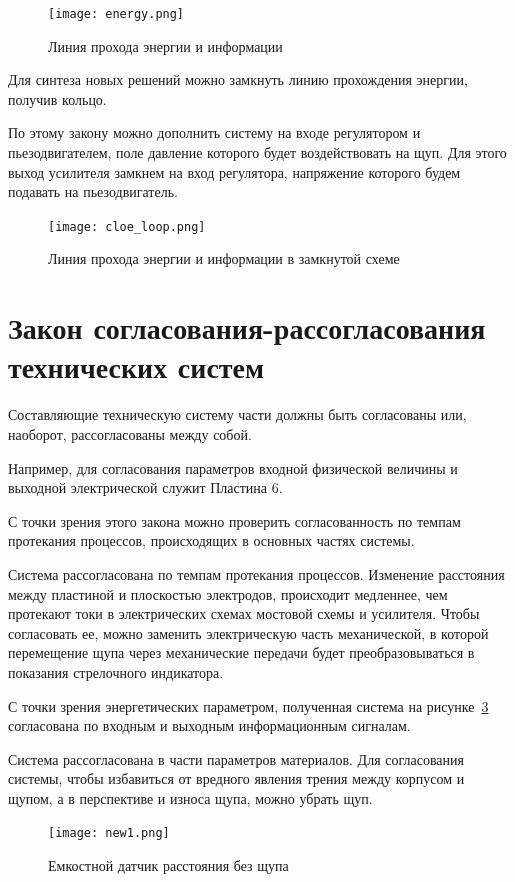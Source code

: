 \begin{figure}[h!]
	\centering
	\texttt{[image: energy.png]}
	\caption{Линия прохода энергии и информации}
	\label{}
\end{figure}

Для синтеза новых решений можно замкнуть линию прохождения энергии, получив кольцо. 

По этому закону можно дополнить систему на входе регулятором и пьезодвигателем, поле давление которого будет воздействовать на щуп. Для этого выход усилителя замкнем на вход регулятора, напряжение которого будем подавать на пьезодвигатель.

\begin{figure}[h!]
	\centering
	\texttt{[image: cloe\_loop.png]}
	\caption{Линия прохода энергии и информации в замкнутой схеме}
	\label{sogl1}
\end{figure}

\section{Закон согласования-рассогласования технических систем}

Составляющие техническую систему части должны быть согласованы или, наоборот, рассогласованы между собой.

Например, для согласования параметров входной физической величины и выходной электрической служит Пластина 6.

С точки зрения этого закона можно проверить согласованность по темпам протекания процессов, происходящих в основных частях системы.

Система рассогласована по темпам протекания процессов. Изменение расстояния между пластиной и плоскостью электродов, происходит медленнее, чем протекают токи в электрических схемах мостовой схемы и усилителя. Чтобы согласовать ее, можно заменить электрическую часть механической, в которой перемещение щупа через механические передачи будет преобразовываться в показания стрелочного индикатора.

С точки зрения энергетических параметром, полученная система на рисунке~\ref{sogl1} согласована по входным и выходным информационным сигналам.

Система рассогласована в части параметров материалов. Для согласования системы, чтобы избавиться от вредного явления трения между корпусом и щупом, а в перспективе и износа щупа, можно убрать щуп.
\begin{figure}[h!]
	\centering
	\texttt{[image: new1.png]}
	\caption{Емкостной датчик расстояния без щупа}
	\label{sogl1}
\end{figure}


